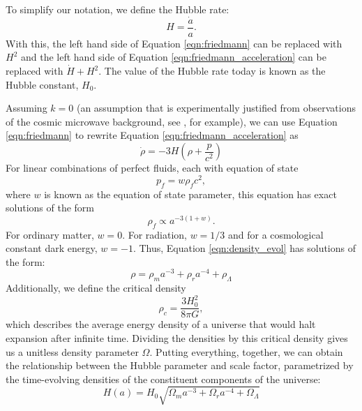 To simplify our notation, we define the Hubble rate:
$$H=\frac{\dot{a}}{a}.$$
With this, the left hand side of Equation \ref{eqn:friedmann} can be replaced with $H^2$ and the left hand side of Equation \ref{eqn:friedmann_acceleration} can be replaced with $\dot{H} + H^2$.  The value of the Hubble rate today is known as the Hubble constant, $H_0$.

Assuming $k=0$ (an assumption that is experimentally justified from observations of the cosmic microwave background, see \citet{planck_collaboration_planck_2016}, for example), we can use Equation \ref{eqn:friedmann} to rewrite Equation \ref{eqn:friedmann_acceleration} as
\begin{equation}
    \dot{\rho} = -3H\left(\rho + \frac{p}{c^2}\right)
    \label{eqn:density_evol}
\end{equation}
For linear combinations of perfect fluids, each with equation of state
$$p_f = w\rho_f c^2,$$
where $w$ is known as the equation of state parameter, this equation has exact solutions of the form
$$\rho_f \propto a^{-3(1+w)}.$$
For ordinary matter, $w=0$. For radiation, $w=1/3$ and for a cosmological constant dark energy, $w=-1$. Thus, Equation \ref{eqn:density_evol} has solutions of the form:
$$\rho = \rho_m a^{-3} + \rho_r a^{-4} + \rho_\Lambda$$
Additionally, we define the critical density
$$\rho_{c} = \frac{3H_0^2}{8\pi G},$$
which describes the average energy density of a universe that would halt expansion after infinite time. Dividing the densities by this critical density gives us a unitless density parameter $\Omega$. Putting everything, together, we can obtain the relationship between the Hubble parameter and scale factor, parametrized by the time-evolving densities of the constituent components of the universe:
\begin{equation}
    H(a) = H_0\sqrt{\Omega_m a^{-3} + \Omega_r a^{-4} + \Omega_\Lambda}
    \label{eqn:hubble_vs_a}
\end{equation}

